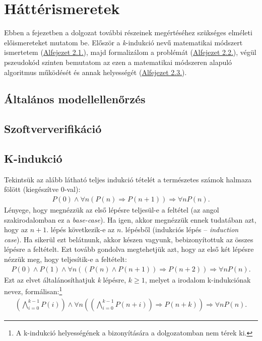 \chapter{Háttérismeretek}

Ebben a fejezetben a dolgozat további részeinek megértéséhez szükséges elméleti előismereteket mutatom be. Először a \emph{k}-indukció nevű matematikai módszert \cite{k_induction_principle} ismertetem (\hyperlink{section.2.1}{Alfejezet 2.1.}), majd formalizálom a problémát (\hyperlink{section.2.2}{Alfejezet 2.2.}), végül pszeudokód szinten bemutatom az ezen a matematikai módszeren alapuló algoritmus működését és annak helyességét (\hyperlink{section.2.3}{Alfejezet 2.3.}).

\section{Általános modellellenőrzés}

\section{Szoftververifikáció}

\section{K-indukció}
\label{sec:k_induction}

Tekintsük az alább látható teljes indukció tételét a természetes számok halmaza fölött (kiegészítve 0-val): 
\begin{align}
	P(0) \wedge \forall n (P(n) \Rightarrow P(n+1)) \Rightarrow \forall nP(n).
\end{align}
Lényege, hogy megnézzük az első lépésre teljesül-e a feltétel (az angol szakirodalomban ez a \emph{base-case}). Ha igen, akkor megnézzük ennek tudatában azt, hogy az $n+1$. lépés következik-e az $n$. lépésből (indukciós lépés -- \emph{induction case}). Ha sikerül ezt belátnunk, akkor készen vagyunk, bebizonyítottuk az összes lépésre a feltételt.
\newline
\newline
Ezt tovább gondolva megtehetjük azt, hogy az első két lépésre nézzük meg, hogy teljesítik-e a feltételt:
\begin{align}
	P(0) \wedge P(1) \wedge \forall n ((P(n) \wedge P(n+1)) \Rightarrow P(n+2) ) \Rightarrow \forall n P(n).
\end{align}
Ezt az elvet általánosíthatjuk \emph{k} lépésre, $k \geq 1$, melyet a irodalom \cite{k_induction_principle} k-indukciónak nevez, formálisan:\footnote{A k-indukció helyességének a bizonyítására a dolgozatomban nem térek ki.}
\begin{align}
	\left( \bigwedge_{i=0}^{k-1} P(i) \right) \wedge \forall n \left( \left( \bigwedge_{i=0}^{k-1} P(n+i) \right) \Rightarrow P(n+k) \right) \Rightarrow \forall n P(n).
\end{align}

